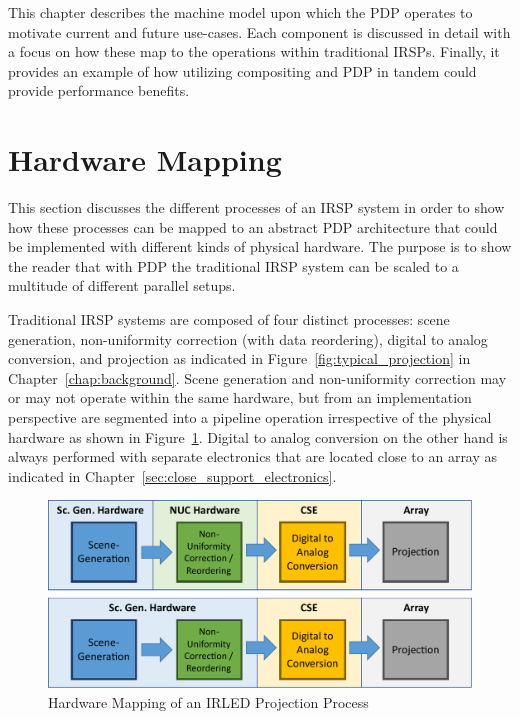 \label{chap:machine_model}
This chapter describes the machine model upon which the PDP operates to motivate current and future use-cases. Each component is discussed in detail with a focus on how these map to the operations within traditional IRSPs. Finally, it provides an example of how utilizing compositing and PDP in tandem could provide performance benefits.

\section{Hardware Mapping}
    This section discusses the different processes of an IRSP system in order to show how these processes can be mapped to an abstract PDP architecture that could be implemented with different kinds of physical hardware. The purpose is to show the reader that with PDP the traditional IRSP system can be scaled to a multitude of different parallel setups.

    Traditional IRSP systems are composed of four distinct processes: scene generation, non-uniformity correction (with data reordering), digital to analog conversion, and projection as indicated in Figure~\ref{fig:typical_projection} in Chapter~\ref{chap:background}. Scene generation and non-uniformity correction may or may not operate within the same hardware, but from an implementation perspective are segmented into a pipeline operation irrespective of the physical hardware as shown in Figure~\ref{fig:typical_projection_hardware}. Digital to analog conversion on the other hand is always performed with separate electronics that are located close to an array as indicated in Chapter~\ref{sec:close_support_electronics}.

    \begin{figure}
        \centering
        \includegraphics[width=1.0\textwidth]{fig/typical_projection_system_hardware.pdf}
        \caption{Hardware Mapping of an IRLED Projection Process}
        \label{fig:typical_projection_hardware}
    \end{figure}


